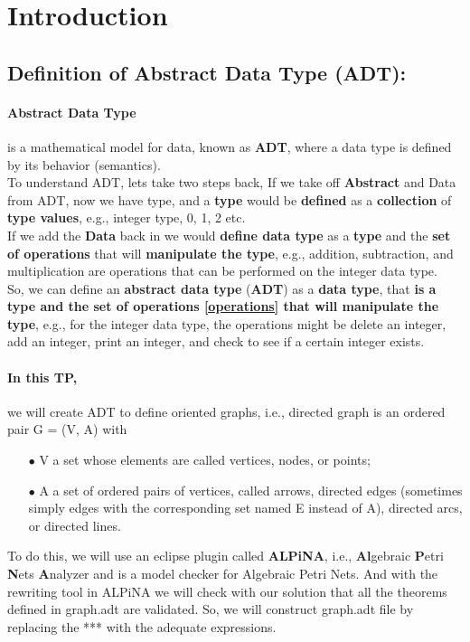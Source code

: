 \documentclass{article}
\begin{document}

\section{Introduction}

\subsection{Definition of Abstract Data Type (ADT):}

\paragraph{Abstract Data Type}is a mathematical model for data, known as \textbf{ADT}, where a data type is defined by its behavior (semantics).\\
To understand ADT, lets take two steps back, If we take off \textbf{Abstract} and Data from ADT, now we have type, and a \textbf{type} would be \textbf{defined} as a \textbf{collection} of \textbf{type values}, e.g., integer type, 0, 1, 2 etc.\\
If we add the \textbf{Data} back in we would \textbf{define data type} as  a \textbf{type} and the \textbf{set of operations} that will \textbf{manipulate the type}, e.g., addition, subtraction, and multiplication are operations that can be performed on the integer data type.\\
So, we can define an \textbf{abstract data type} (\textbf{ADT}) as a \textbf{data type}, that \textbf{is a type and the set of operations\label{operationsapp} \ref{operations} that will manipulate the type}, e.g., for the integer data type, the operations might be delete an integer, add an integer, print an integer, and check to see if a certain integer exists.\paragraph{In this TP,}we will create ADT to define oriented graphs, i.e., directed graph is an ordered pair G = (V, A) with
\begin{itemize}
\item[$\bullet$] V a set whose elements are called vertices, nodes\label{node}, or points;
\item[$\bullet$] A a set of ordered pairs of vertices, called arrows, directed edges (sometimes simply edges with the corresponding set named E instead of A), directed arcs, or directed lines.
\end{itemize} To do this, we will use an eclipse plugin called \textbf{ALPiNA}, i.e., \textbf{Al}gebraic \textbf{P}etri \textbf{N}ets \textbf{A}nalyzer and is a model checker for Algebraic Petri Nets. And with the rewriting tool in ALPiNA we will check with our solution that all the theorems defined in \textcolor{colour3}{graph.adt} are validated.
So, we will construct \textcolor{colour3}{graph.adt} file by replacing the *** with the adequate expressions.
\end{document}
